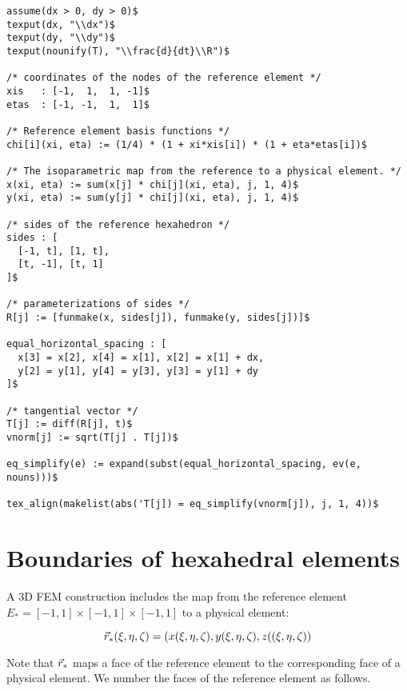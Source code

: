 \documentclass[11pt]{article}
\begin{document}
\begin{verbatim}
assume(dx > 0, dy > 0)$
texput(dx, "\\dx")$
texput(dy, "\\dy")$
texput(nounify(T), "\\frac{d}{dt}\\R")$

/* coordinates of the nodes of the reference element */
xis   : [-1,  1,  1, -1]$
etas  : [-1, -1,  1,  1]$

/* Reference element basis functions */
chi[i](xi, eta) := (1/4) * (1 + xi*xis[i]) * (1 + eta*etas[i])$

/* The isoparametric map from the reference to a physical element. */
x(xi, eta) := sum(x[j] * chi[j](xi, eta), j, 1, 4)$
y(xi, eta) := sum(y[j] * chi[j](xi, eta), j, 1, 4)$

/* sides of the reference hexahedron */
sides : [
  [-1, t], [1, t],
  [t, -1], [t, 1]
]$

/* parameterizations of sides */
R[j] := [funmake(x, sides[j]), funmake(y, sides[j])]$

equal_horizontal_spacing : [
  x[3] = x[2], x[4] = x[1], x[2] = x[1] + dx,
  y[2] = y[1], y[4] = y[3], y[3] = y[1] + dy
]$

/* tangential vector */
T[j] := diff(R[j], t)$
vnorm[j] := sqrt(T[j] . T[j])$

eq_simplify(e) := expand(subst(equal_horizontal_spacing, ev(e, nouns)))$

tex_align(makelist(abs('T[j]) = eq_simplify(vnorm[j]), j, 1, 4))$
\end{verbatim}

\section{Boundaries of hexahedral elements}
\label{sec-4}

A 3D FEM construction includes the map from the reference element
$E_{*} = [-1, 1] \times [-1,1] \times [-1,1]$ to a physical element:

\begin{equation}
\label{eq:6}
\vec r_{*}(\xi,\eta,\zeta) = \left( x(\xi,\eta,\zeta), y(\xi,\eta,\zeta), z((\xi,\eta,\zeta) \right)
\end{equation}

Note that $\vec r_{*}$ maps a face of the reference element to the
corresponding face of a physical element. We number the faces of the
reference element as follows.
\end{document}
